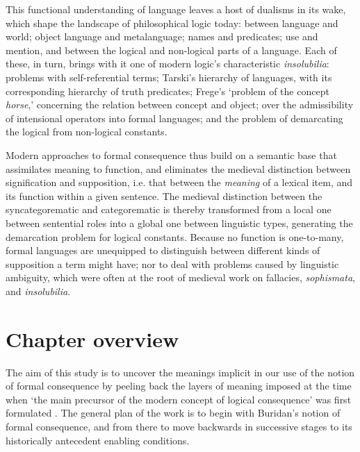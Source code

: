 \documentclass[]{article}
\begin{document}
		This functional understanding of language leaves a host of dualisms in its wake, which shape the landscape of philosophical logic today: between language and world; object language and metalanguage; names and predicates; use and mention, and between the logical and non-logical parts of a language. Each of these, in turn, brings with it one of modern logic's characteristic \textit{insolubilia}: problems with self-referential terms; Tarski's hierarchy of languages, with its corresponding hierarchy of truth predicates; Frege's `problem of the concept \textit{horse},' concerning the relation between concept and object; over the admissibility of intensional operators into formal languages; and the problem of demarcating the logical from non-logical constants.
		
		Modern approaches to formal consequence thus build on a semantic base that assimilates meaning to function, and eliminates the medieval distinction between signification and supposition, i.e. that between the \textit{meaning} of a lexical item, and its function within a given sentence. The medieval distinction between the syncategorematic and categorematic is thereby transformed from a local one between sentential roles into a global one between linguistic types, generating the demarcation problem for logical constants. Because no function is one-to-many, formal languages are unequipped to distinguish between different kinds of supposition a term might have; nor to deal with problems caused by linguistic ambiguity, which were often at the root of medieval work on fallacies, \textit{sophismata}, and \textit{insolubilia}.
		
\section{Chapter overview}
The aim of this study is to uncover the meanings implicit in our use of the notion of formal consequence by peeling back the layers of meaning imposed at the time when `the main precursor of the modern concept of logical consequence' was first formulated \cite{DutilhNovaes2012a}. The general plan of the work is to begin with Buridan's notion of formal consequence, and from there to move backwards in successive stages to its historically antecedent enabling conditions. 
\end{document}

